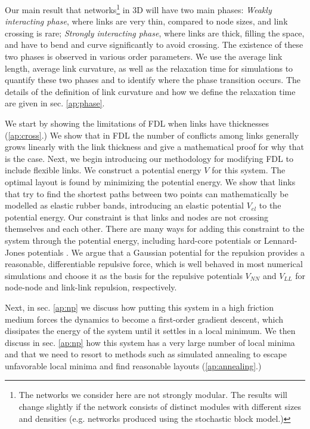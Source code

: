 \documentclass[nofootinbib,preprint,floatfix,titlepage,superscriptaddress]{revtex4} %
\begin{document}
Our main result that networks\footnote{The networks we consider here are not strongly modular. The results will change slightly if the network consists of distinct modules with different sizes and densities (e.g. networks produced using the stochastic block model.)} 
in 3D will have two main phases: {\em Weakly interacting phase}, where links are very thin, compared to node sizes, and link crossing is rare; {\em Strongly interacting phase}, where links are thick, filling the space, and have to bend and curve significantly to avoid crossing.
The existence of these two phases is observed in various order parameters. 
We use the average link length, average link curvature, as well as the relaxation time for simulations to quantify these two phases and to identify where the phase transition occurs. 
The details of the definition of link curvature and how we define the relaxation time are given in sec. \ref{ap:phase}.

We start by showing the limitations of FDL when links have thicknesses (\ref{ap:cross}.) 
We show that in FDL the number of conflicts among links generally grows linearly with the link thickness and give a mathematical proof for why that is the case. 
Next, we begin introducing our methodology for modifying FDL to include flexible links.
We construct a potential energy $V$ for this system. 
The optimal layout is found by minimizing the potential energy. 
We show that links that try to find the shortest paths between two points can mathematically be modelled as elastic rubber bands, introducing an elastic potential $V_{el}$ to the potential energy.
Our constraint is that links and nodes are not crossing themselves and each other.
There are many ways for adding this constraint to the system through the potential energy, including hard-core potentials or Lennard-Jones potentials \citep{lennard1924determination}. 
We argue that a Gaussian potential for the repulsion provides a reasonable, differentiable repulsive force, which is well behaved in most numerical simulations and choose it as the basis for the repulsive potentials $V_{NN}$ and $V_{LL}$ for node-node and link-link repulsion, respectively. 

Next, in sec. \ref{ap:np} we discuss how putting this system in a high friction medium forces the dynamics to become a first-order gradient descent, which dissipates the energy of the system until it settles in a local minimum. 
We then discuss in sec. \ref{ap:np}  how this system has a very large number of local minima and that we need to resort to methods such as simulated  annealing to escape unfavorable local minima and find reasonable layouts (\ref{ap:annealing}.)  
\end{document}
